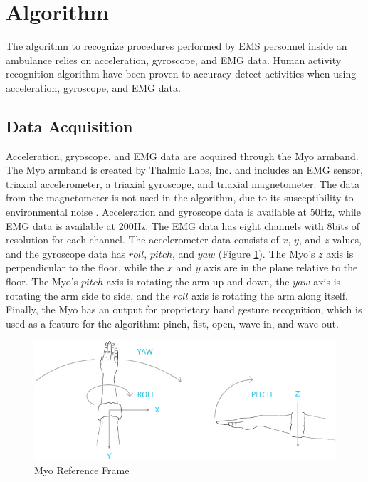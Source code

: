 \section{Algorithm}
\label{sec:Approach:Algorithm}
The algorithm to recognize procedures performed by EMS personnel inside an ambulance relies on acceleration, gyroscope, and EMG data. Human activity recognition algorithm have been proven to accuracy detect activities when using acceleration, gyroscope, and EMG data.

\subsection{Data Acquisition}
Acceleration, gryoscope, and EMG data are acquired through the Myo armband. The Myo armband is created by Thalmic Labs, Inc. and includes an EMG sensor, triaxial accelerometer, a triaxial gyroscope, and triaxial magnetometer. The data from the magnetometer is not used in the algorithm, due to its susceptibility to environmental noise \cite{Ahmad2013}. Acceleration and gyroscope data is available at 50Hz, while EMG data is available at 200Hz. The EMG data has eight channels with 8bits of resolution for each channel. The accelerometer data consists of $x$, $y$, and $z$ values, and the gyroscope data has $roll$, $pitch$, and $yaw$ (Figure \ref{fig:myo}). The Myo's $z$ axis is perpendicular to the floor, while the $x$ and $y$ axis are in the plane relative to the floor. The Myo's $pitch$ axis is rotating the arm up and down, the $yaw$ axis is rotating the arm side to side, and the $roll$ axis is rotating the arm along itself. Finally, the Myo has an output for proprietary hand gesture recognition, which is used as a feature for the algorithm: pinch, fist, open, wave in, and wave out.

\begin{figure}
	\centering
	\includegraphics[width=0.7\linewidth]{pictures/myo}
	\caption{Myo Reference Frame}
	\label{fig:myo}
\end{figure}


